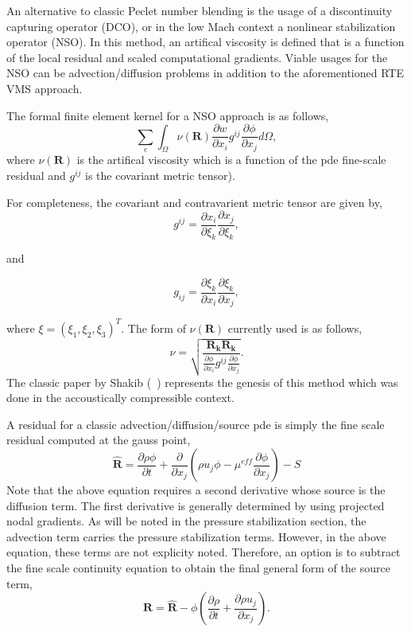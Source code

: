 An alternative to classic Peclet number blending is the usage of a discontinuity 
capturing operator (DCO), or in the low Mach context a nonlinear stabilization 
operator (NSO). In this method, an artifical viscosity is defined that is a function 
of the local residual and scaled computational gradients. Viable usages for the NSO 
can be advection/diffusion problems in addition to the aforementioned RTE VMS approach.

The formal finite element kernel for a NSO approach is as follows,
\begin{equation}
  \sum_e \int_\Omega \nu(\mathbf{R}) \frac{\partial w}{\partial x_i} g^{ij} \frac{\partial \phi} {\partial x_j} d\Omega,
\label{nsoFEMForm}
\end{equation}
where $\nu(\mathbf{R})$ is the artifical viscosity which is a function of the pde fine-scale 
residual and $g^{ij}$ is the covariant metric tensor).

For completeness, the covariant and contravarient metric tensor are given by,
\begin{equation}
  g^{ij} = \frac{\partial x_i} {\partial \xi_k}\frac{\partial x_j} {\partial \xi_k},
\label{coVariant}
\end{equation}

 and

\begin{equation}
  g_{ij} = \frac{\partial \xi_k} {\partial x_i} \frac{\partial \xi_k} {\partial x_j},
\label{coVariant}
\end{equation}

where $\xi = (\xi_1, \xi_2, \xi_3)^T$.
%
The form of $\nu(\mathbf{R})$ currently used is as follows,
\begin{equation}
  \nu = \sqrt{ \frac{\mathbf{R_k} \mathbf{R_k}} {\frac {\partial \phi}{\partial x_i} g^{ij} \frac{\partial \phi}{\partial x_j}} }.
\label{nuOne}
\end{equation}
The classic paper by Shakib (~\cite{Shakib:1991}) represents the genesis of this method which was done 
in the accoustically compressible context.

A residual for a classic advection/diffusion/source pde is simply the fine scale residual 
computed at the gauss point,
\begin{equation}
 \mathbf{\hat R} = \frac{\partial \rho \phi}{\partial t} + \frac{\partial}{\partial x_j} (\rho u_j \phi - \mu^{eff} \frac{\partial \phi}{\partial x_j}) -S
 \label{nsoResidual}
\end{equation}
Note that the above equation requires a second derivative whose source is the 
diffusion term. The first derivative is generally determined by using projected 
nodal gradients. As will be noted in the pressure stabilization section, the advection 
term carries the pressure stabilization terms. However, in the above equation, these 
terms are not explicity noted. Therefore, an option is to subtract the fine scale 
continuity equation to obtain the final general form of the source term,
\begin{equation}
 \mathbf{R} = \mathbf{\hat R} - \phi (\frac{\partial \rho}{\partial t} + \frac{\partial \rho u_j }{\partial x_j}).
 \label{nsoResidual}
\end{equation}

